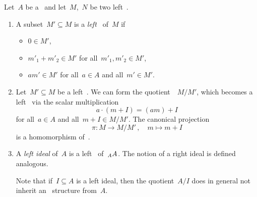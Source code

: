 \begin{remarkdefinition}
  Let~$A$ be a~{\kalg} and let~$M$,~$N$ be two left~{}.
  \begin{enumerate}
    \item
      A subset~$M' \subseteq M$ is a \emph{left~{}} of~$M$ if
      \begin{itemize}
        \item
          $0 \in M'$,
        \item
          $m'_1 + m'_2 \in M'$ for all~$m'_1, m'_2 \in M'$,
        \item
          $a m' \in M'$ for all~$a \in A$ and all~$m' \in M'$.
      \end{itemize}
    \item
      Let~$M' \subseteq M$ be a left~{}.
      We can form the quotient~{\module{$\kf$}}~$M/M'$, which becomes a left~{} via the scalar multiplication
      \[
          a \cdot (m + I)
        = (am) + I
      \]
      for all~$a \in A$ and all~$m + I \in M/M'$.
      The canonical projection
      \[
                \pi
        \colon  M
        \to     M/M' \,,
        \quad   m
        \mapsto m + I
      \]
      is a homomorphism of~{}.
    \item
      A \emph{left ideal} of~$A$ is a left~{} of~$\indmodule[A]{A}$.
      The notion of a right ideal is defined analogous.
      
      Note that if~$I \subseteq A$ is a left ideal, then the quotient~$A/I$ does in general not inherit an~{\kalg} structure from~$A$.


\end{enumerate}
\end{remarkdefinition}
